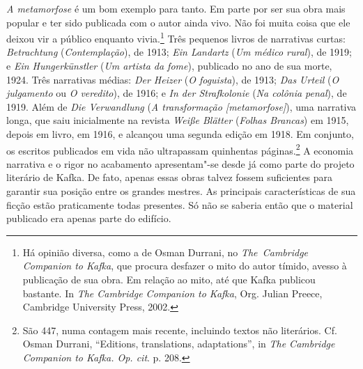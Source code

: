 \textit{A metamorfose} é um bom exemplo para tanto. Em parte por ser sua
obra mais popular e ter sido publicada com o autor ainda vivo. Não
foi muita coisa que ele deixou vir a público enquanto vivia.\footnote{
Há opinião diversa, como a de Osman Durrani, no \textit{\mbox{The Cambridge}
Companion to Kafka}, que procura desfazer o mito do autor tímido, avesso à
publicação de sua obra. Em relação ao mito, até que Kafka publicou
bastante. In \textit{The Cambridge
Companion to Kafka}, Org. Julian Preece, Cambridge University Press,
2002.} Três pequenos livros de narrativas curtas:
\textit{Betrachtung} (\textit{Contemplação}), de 1913; \textit{Ein
Landartz} (\textit{Um médico rural}), de 1919; e \textit{Ein
Hungerkünstler} (\textit{Um artista da fome}), publicado no ano de sua
morte, 1924. Três narrativas médias: \textit{Der Heizer} (\textit{O
foguista}), de 1913; \textit{Das Urteil} (\textit{O julgamento} ou
\textit{O veredito}), de 1916; e \textit{In der Strafkolonie}
(\textit{Na colônia penal}), de 1919. Além de \textit{Die Verwandlung}
(\textit{A transformação [metamorfose]}), uma narrativa
longa, que saiu inicialmente na revista \textit{Weiße Blätter}
(\textit{Folhas Brancas}) em 1915, depois em livro, em 1916, e alcançou
uma segunda edição em 1918. Em conjunto, os escritos publicados em vida
não ultrapassam quinhentas páginas.\footnote{ São 447, numa contagem
mais recente, incluindo textos não literários. Cf. Osman Durrani,
“Editions, translations, adaptations”, in \textit{The Cambridge
Companion to Kafka. Op. cit}. p. 208.} A economia narrativa e o rigor no acabamento
apresentam"-se desde já como parte do projeto literário de Kafka. De
fato, apenas essas obras talvez fossem suficientes para garantir sua
posição entre os grandes mestres. As principais características de sua
ficção estão praticamente todas presentes. Só não se saberia então que
o material publicado era apenas parte do edifício.

